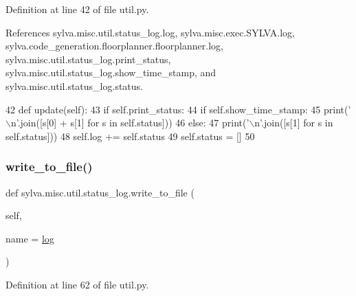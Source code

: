 Definition at line 42 of file util.\+py.



References sylva.\+misc.\+util.\+status\+\_\+log.\+log, sylva.\+misc.\+exec.\+S\+Y\+L\+V\+A.\+log, sylva.\+code\+\_\+generation.\+floorplanner.\+floorplanner.\+log, sylva.\+misc.\+util.\+status\+\_\+log.\+print\+\_\+status, sylva.\+misc.\+util.\+status\+\_\+log.\+show\+\_\+time\+\_\+stamp, and sylva.\+misc.\+util.\+status\+\_\+log.\+status.


\begin{DoxyCode}
42     \textcolor{keyword}{def }update(self):
43         \textcolor{keywordflow}{if} self.print\_status:
44             \textcolor{keywordflow}{if} self.show\_time\_stamp:
45                 print(\textcolor{stringliteral}{'\(\backslash\)n'}.join([s[0] + s[1] \textcolor{keywordflow}{for} s \textcolor{keywordflow}{in} self.status]))
46             \textcolor{keywordflow}{else}:
47                 print(\textcolor{stringliteral}{'\(\backslash\)n'}.join([s[1] \textcolor{keywordflow}{for} s \textcolor{keywordflow}{in} self.status]))
48         self.log += self.status
49         self.status = []
50 
\end{DoxyCode}
\mbox{\label{classsylva_1_1misc_1_1util_1_1status__log_a8785c236977e889558120ddd31d9b2e6}} 
\subsubsection{\texorpdfstring{write\+\_\+to\+\_\+file()}{write\_to\_file()}}
{\footnotesize\ttfamily def sylva.\+misc.\+util.\+status\+\_\+log.\+write\+\_\+to\+\_\+file (\begin{DoxyParamCaption}\item[{}]{self,  }\item[{}]{name = {\ttfamily \textquotesingle{}\hyperlink{classsylva_1_1misc_1_1util_1_1status__log_ab581acbcedf70a8afe11c96ea003e951}{log}\textquotesingle{}} }\end{DoxyParamCaption})}



Definition at line 62 of file util.\+py.



